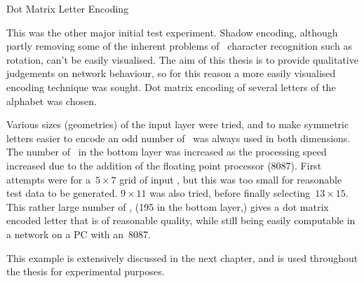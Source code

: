 \sec Dot Matrix Letter Encoding

This was the other major initial test experiment.
Shadow encoding, although partly removing some of the inherent problems of
\nn\ character recognition such as rotation, can't be easily
visualised.
The aim of this thesis is to provide qualitative judgements on
network behaviour, so for this reason a more easily visualised
encoding technique was sought.
Dot matrix encoding of several letters of the alphabet was chosen.

Various sizes (geometries) of the input layer were tried, and to make symmetric
letters easier to encode an odd number of \neus\ was always used in
both dimensions.
The number of \neus\ in the bottom layer was increased as the
processing speed increased due to the addition of the floating
point processor (8087).
First attempts were for a~$5\times 7$ grid of input \neus, but this
was too small for reasonable test data to be generated.
$9\times 11$ was also tried, before finally selecting~$13\times 15$.
This rather large number of \neus, (195 in the bottom layer,) gives
a dot matrix encoded letter that is of reasonable quality, while
still being easily computable in a network on a PC with
an~8087.

This example is extensively discussed in the next chapter, and is
used throughout the thesis for experimental purposes.

